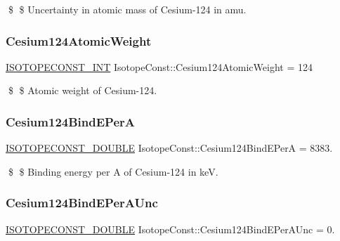 \$ \$ Uncertainty in atomic mass of Cesium-\/124 in amu. \mbox{\label{group___isotope_const-_cesium-_cs124_gae345283f1fa5622ed94eeae106612acd}} 
\subsubsection{\texorpdfstring{Cesium124\+Atomic\+Weight}{Cesium124AtomicWeight}}
{\footnotesize\ttfamily \mbox{\hyperlink{group___isotope_const-_macros_ga5f18360b3e99483a35c32d789e62621c}{I\+S\+O\+T\+O\+P\+E\+C\+O\+N\+S\+T\+\_\+\+I\+NT}} Isotope\+Const\+::\+Cesium124\+Atomic\+Weight = 124}

\$ \$ Atomic weight of Cesium-\/124. \mbox{\label{group___isotope_const-_cesium-_cs124_ga28364a8b2c4059632c379ba897fdd083}} 
\subsubsection{\texorpdfstring{Cesium124\+Bind\+E\+PerA}{Cesium124BindEPerA}}
{\footnotesize\ttfamily \mbox{\hyperlink{group___isotope_const-_macros_ga8f45a7272ce02c0b4c65c44636ed719a}{I\+S\+O\+T\+O\+P\+E\+C\+O\+N\+S\+T\+\_\+\+D\+O\+U\+B\+LE}} Isotope\+Const\+::\+Cesium124\+Bind\+E\+PerA = 8383.}

\$ \$ Binding energy per A of Cesium-\/124 in keV. \mbox{\label{group___isotope_const-_cesium-_cs124_ga3f79cf95ae14639ec10fa4bc1f876e18}} 
\subsubsection{\texorpdfstring{Cesium124\+Bind\+E\+Per\+A\+Unc}{Cesium124BindEPerAUnc}}
{\footnotesize\ttfamily \mbox{\hyperlink{group___isotope_const-_macros_ga8f45a7272ce02c0b4c65c44636ed719a}{I\+S\+O\+T\+O\+P\+E\+C\+O\+N\+S\+T\+\_\+\+D\+O\+U\+B\+LE}} Isotope\+Const\+::\+Cesium124\+Bind\+E\+Per\+A\+Unc = 0.}

